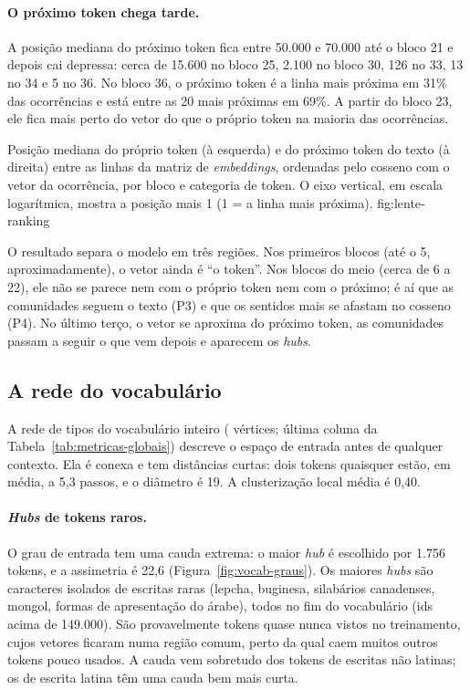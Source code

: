 \paragraph{O próximo token chega tarde.} A posição mediana do próximo token fica entre 50.000 e
70.000 até o bloco 21 e depois cai depressa: cerca de 15.600 no bloco 25, 2.100 no bloco 30,
126 no 33, 13 no 34 e 5 no 36. No bloco 36, o próximo token é a linha mais próxima em 31\% das ocorrências
e está entre as 20 mais próximas em 69\%. A partir do bloco 23, ele fica mais perto do vetor do
que o próprio token na maioria das ocorrências.

    {Posição mediana do próprio token (à esquerda) e do próximo token do texto (à direita) entre
    as linhas da matriz de \emph{embeddings}, ordenadas pelo cosseno com o vetor da ocorrência,
    por bloco e categoria de token. O eixo vertical, em escala logarítmica, mostra a posição
    mais 1 (1 = a linha mais próxima).}
    {fig:lente-ranking}

O resultado separa o modelo em três regiões. Nos primeiros blocos (até o 5, aproximadamente), o
vetor ainda é ``o token''. Nos blocos do meio (cerca de 6 a 22), ele não se parece nem com o
próprio token nem com o próximo; é aí que as comunidades seguem o texto (P3) e que os sentidos
mais se afastam no cosseno (P4). No último terço, o vetor se aproxima do próximo token, as
comunidades passam a seguir o que vem depois e aparecem os \emph{hubs}.

\subsection{A rede do vocabulário}\label{sec:res-vocab}

A rede de tipos do vocabulário inteiro (\nTiposVocab{} vértices; última coluna da
Tabela~\ref{tab:metricas-globais}) descreve o espaço de entrada antes de qualquer contexto.
Ela é conexa e tem distâncias curtas: dois tokens quaisquer estão, em média, a 5,3 passos, e o
diâmetro é 19. A clusterização local média é 0,40.

\paragraph{\emph{Hubs} de tokens raros.} O grau de entrada tem uma cauda extrema: o maior
\emph{hub} é escolhido por 1.756 tokens, e a assimetria é 22,6 (Figura~\ref{fig:vocab-graus}).
Os maiores \emph{hubs} são caracteres isolados de escritas raras (lepcha, buginesa, silabários
canadenses, mongol, formas de apresentação do árabe), todos no fim do vocabulário (ids acima de
149.000). São provavelmente tokens quase nunca vistos no treinamento, cujos vetores ficaram
numa região comum, perto da qual caem muitos outros tokens pouco usados. A cauda vem sobretudo
dos tokens de escritas não latinas; os de escrita latina têm uma cauda bem mais curta.

